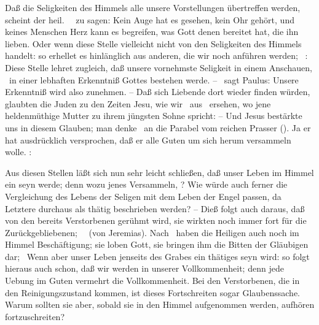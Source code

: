 \begin{aufza}
\item Daß die Seligkeiten des Himmels alle unsere Vorstellungen übertreffen werden, scheint der heil.\   \ zu sagen: Kein Auge hat es gesehen, kein Ohr gehört, und keines Menschen Herz kann es begreifen, was Gott denen bereitet hat, die ihn lieben. Oder wenn diese Stelle vielleicht nicht von den Seligkeiten des Himmels handelt: so erhellet es hinlänglich aus anderen, die wir noch anführen werden; \zB\ :  Diese Stelle lehret zugleich, daß unsere vornehmste Seligkeit in einem Anschauen, \dh\ in einer lebhaften Erkenntniß Gottes bestehen werde. -- \ sagt Paulus:  Unsere Erkenntniß wird also zunehmen. -- Daß sich Liebende dort wieder finden würden, glaubten die Juden zu den Zeiten Jesu, wie wir \zB\ aus \ ersehen, wo jene heldenmüthige Mutter zu ihrem jüngsten Sohne spricht:  -- Und Jesus bestärkte uns in diesem Glauben; man denke \zB\ an die Parabel vom reichen Prasser (). Ja er hat ausdrücklich versprochen, daß er alle Guten um sich herum versammeln wolle. : 
\begin{RWanm} 
Aus diesen Stellen läßt sich nun sehr leicht schließen, daß unser Leben im Himmel ein  seyn werde; denn wozu jenes Versammeln, \usw ? Wie würde auch ferner die Vergleichung des Lebens der Seligen mit dem Leben der Engel passen, da Letztere durchaus als thätig beschrieben werden? -- Dieß folgt auch daraus, daß von den bereits Verstorbenen gerühmt wird, sie wirkten noch immer fort für die Zurückgebliebenen; \zB\ \ (von Jeremias). Nach \ haben die Heiligen auch noch im Himmel Beschäftigung; sie loben Gott, sie bringen ihm die Bitten der Gläubigen dar; \usw\ Wenn aber unser Leben jenseits des Grabes ein thätiges seyn wird: so folgt hieraus auch schon, daß wir  werden in unserer Vollkommenheit; denn jede Uebung im Guten vermehrt die Vollkommenheit. Bei den Verstorbenen, die in den Reinigungszustand kommen, ist dieses Fortschreiten sogar Glaubenssache. Warum sollten sie aber, sobald sie in den Himmel aufgenommen werden, aufhören fortzuschreiten? \end{RWanm}

\end{aufza}
